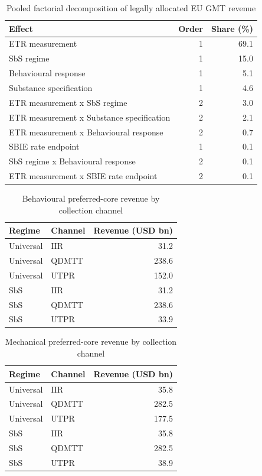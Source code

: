 \begin{table}[H]
\centering
\caption{Pooled factorial decomposition of legally allocated EU GMT revenue}
\label{tab:stage4_6_anova_pooled_generated}
\small
\begin{tabular}{@{}lrr@{}}
\toprule
Effect & Order & Share (\%) \\
\midrule
ETR measurement & 1 & 69.1 \\
SbS regime & 1 & 15.0 \\
Behavioural response & 1 & 5.1 \\
Substance specification & 1 & 4.6 \\
ETR measurement x SbS regime & 2 & 3.0 \\
ETR measurement x Substance specification & 2 & 2.1 \\
ETR measurement x Behavioural response & 2 & 0.7 \\
SBIE rate endpoint & 1 & 0.1 \\
SbS regime x Behavioural response & 2 & 0.1 \\
ETR measurement x SBIE rate endpoint & 2 & 0.1 \\
\bottomrule
\end{tabular}
\end{table}

\begin{table}[H]
\centering
\caption{Behavioural preferred-core revenue by collection channel}
\label{tab:stage4_6_preferred_behavioural_channels_generated}
\small
\begin{tabular}{@{}llr@{}}
\toprule
Regime & Channel & Revenue (USD bn) \\
\midrule
Universal & IIR & 31.2 \\
Universal & QDMTT & 238.6 \\
Universal & UTPR & 152.0 \\
SbS & IIR & 31.2 \\
SbS & QDMTT & 238.6 \\
SbS & UTPR & 33.9 \\
\bottomrule
\end{tabular}
\end{table}

\begin{table}[H]
\centering
\caption{Mechanical preferred-core revenue by collection channel}
\label{tab:stage4_6_preferred_channels_generated}
\small
\begin{tabular}{@{}llr@{}}
\toprule
Regime & Channel & Revenue (USD bn) \\
\midrule
Universal & IIR & 35.8 \\
Universal & QDMTT & 282.5 \\
Universal & UTPR & 177.5 \\
SbS & IIR & 35.8 \\
SbS & QDMTT & 282.5 \\
SbS & UTPR & 38.9 \\
\bottomrule
\end{tabular}
\end{table}

